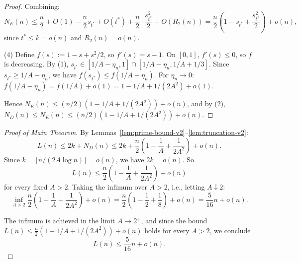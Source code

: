 \documentclass{article}
\begin{document}
\begin{proof}
Combining:
\[
N_E(n) \le \frac{n}{2} + O(1) - \frac{n}{2} s_{t^*} + O(t^*) + \frac{n}{2} \cdot \frac{s_{t^*}^2}{2} + O(R_2(n)) = \frac{n}{2}\left(1 - s_{t^*} + \frac{s_{t^*}^2}{2}\right) + o(n),
\]
since $t^* \le k = o(n)$ and $R_2(n) = o(n)$.

(4) Define $f(s) := 1 - s + s^2/2$, so $f'(s) = s - 1$. On $[0, 1]$, $f'(s) \le 0$, so $f$ is decreasing. By (1), $s_{t^*} \in [1/A - \eta_n, 1] \cap [1/A - \eta_n, 1/A + 1/3]$. Since $s_{t^*} \ge 1/A - \eta_n$, we have $f(s_{t^*}) \le f(1/A - \eta_n)$. For $\eta_n \to 0$: $f(1/A - \eta_n) = f(1/A) + o(1) = 1 - 1/A + 1/(2 A^2) + o(1)$.

Hence $N_E(n) \le (n/2)(1 - 1/A + 1/(2A^2)) + o(n)$, and by (2), $N_D(n) \le N_E(n) \le (n/2)(1 - 1/A + 1/(2 A^2)) + o(n)$.
\end{proof}

\begin{proof}[Proof of Main Theorem]
By Lemmas~\ref{lem:prime-bound-v2}–\ref{lem:truncation-v2}:
\[
L(n) \le 2k + N_D(n) \le 2k + \frac{n}{2}\left(1 - \frac{1}{A} + \frac{1}{2 A^2}\right) + o(n).
\]
Since $k = \lfloor n/(2 A \log n) \rfloor = o(n)$, we have $2k = o(n)$. So
\[
L(n) \le \frac{n}{2}\left(1 - \frac{1}{A} + \frac{1}{2 A^2}\right) + o(n)
\]
for every fixed $A > 2$. Taking the infimum over $A > 2$, i.e., letting $A \downarrow 2$:
\[
\inf_{A > 2} \frac{n}{2}\left(1 - \frac{1}{A} + \frac{1}{2 A^2}\right) + o(n) = \frac{n}{2}\left(1 - \frac{1}{2} + \frac{1}{8}\right) + o(n) = \frac{5}{16} n + o(n).
\]

The infimum is achieved in the limit $A \to 2^+$, and since the bound $L(n) \le \frac{n}{2} (1 - 1/A + 1/(2A^2)) + o(n)$ holds for every $A > 2$, we conclude
\[
L(n) \le \frac{5}{16} n + o(n).
\]
\end{proof}
\end{document}
